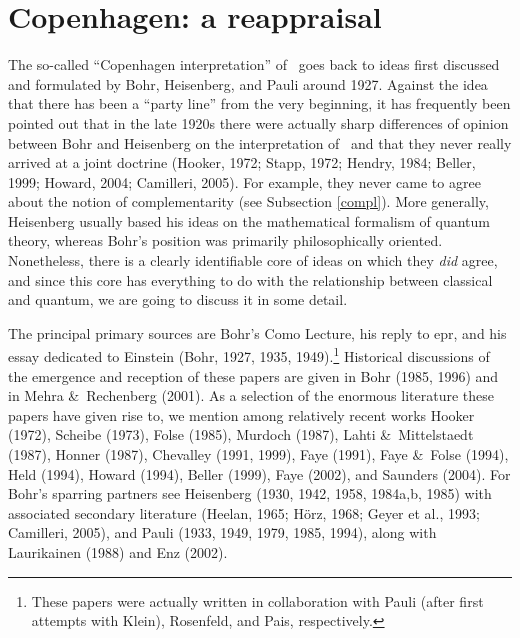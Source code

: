 \documentclass[12pt]{article}
\newcommand{\epr}{{\sc epr}}
\begin{document}
 \section{Copenhagen: a reappraisal}\label{S3}\setcounter{equation}{0}
The  so-called ``Copenhagen interpretation'' of \qm\ goes back to ideas first discussed and formulated by Bohr, Heisenberg, and Pauli around 1927. 
Against the idea that there has been a ``party line'' from the very beginning, 
it has frequently been pointed out that in the late 1920s there were actually sharp differences of opinion between Bohr and Heisenberg on the interpretation of \qm\ and that they never really arrived at a joint doctrine  (Hooker, 1972; Stapp, 1972;  Hendry, 1984;   Beller, 1999;   Howard, 2004; Camilleri, 2005). For example, they never came to agree about the notion of complementarity (see Subsection \ref{compl}). More generally,  Heisenberg usually based  his ideas on the mathematical formalism of quantum theory, whereas Bohr's position was primarily philosophically oriented. Nonetheless, there is a clearly identifiable core of ideas on which they {\it did} agree, and since this core has everything to do with the relationship between classical and quantum, we are going to discuss it in some detail. 

The principal  primary sources are Bohr's Como Lecture, his reply to \epr, and his essay dedicated to Einstein (Bohr, 1927,  1935, 1949).\footnote{ 
These papers were actually written in collaboration with Pauli (after first attempts with Klein), Rosenfeld, and Pais, respectively.}  Historical discussions of the emergence and reception of these papers are given in Bohr (1985, 1996) and in Mehra \&\ Rechenberg (2001).  As a selection of the enormous literature these papers have given rise to, we mention 
among relatively recent works Hooker (1972), Scheibe (1973), Folse (1985), Murdoch (1987), Lahti \&\ Mittelstaedt (1987), Honner (1987), Chevalley (1991, 1999), Faye (1991), Faye \&\ Folse (1994), Held (1994),  Howard (1994),  Beller (1999), Faye (2002), and Saunders (2004).
For Bohr's sparring partners  see Heisenberg (1930, 1942, 1958, 1984a,b, 1985) with associated secondary literature (Heelan, 1965; H\"{o}rz, 1968; Geyer  
et al., 1993; Camilleri, 2005),  and Pauli (1933, 1949, 1979, 1985, 1994), along with Laurikainen (1988) and Enz (2002). 
  
\end{document}

